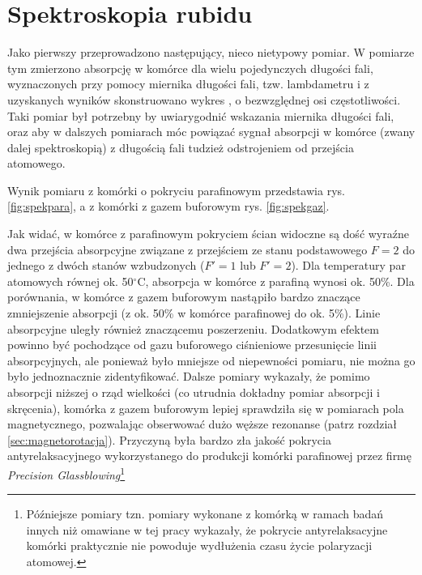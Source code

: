 \documentclass[a4paper,10pt,twoside]{report}
\begin{document}
\nopagebreak
\section{Spektroskopia rubidu}
Jako pierwszy przeprowadzono następujący, nieco nietypowy pomiar.
W pomiarze tym zmierzono absorpcję w komórce dla wielu pojedynczych długości fali, wyznaczonych przy pomocy miernika długości fali, tzw. lambdametru i z uzyskanych wyników skonstruowano wykres , o bezwzględnej osi częstotliwości.
Taki pomiar był potrzebny by uwiarygodnić wskazania miernika długości fali, oraz aby w dalszych pomiarach móc powiązać sygnał absorpcji w komórce (zwany dalej spektroskopią) z długością fali tudzież odstrojeniem od przejścia atomowego.
 
Wynik pomiaru z komórki o pokryciu parafinowym przedstawia rys. \ref{fig:spekpara}, a z komórki z gazem buforowym rys. \ref{fig:spekgaz}.


Jak widać, w komórce z parafinowym pokryciem ścian widoczne są dość wyraźne dwa przejścia absorpcyjne związane z przejściem ze stanu podstawowego $F=2$ do jednego z dwóch stanów wzbudzonych ($F'=1$ lub $F'=2$). Dla temperatury par atomowych równej ok. 50$^\circ$C, absorpcja w komórce z parafiną wynosi ok. 50\%. Dla porównania, w komórce z gazem buforowym nastąpiło bardzo znaczące zmniejszenie absorpcji (z ok. 50\% w komórce parafinowej do ok. 5\%). Linie absorpcyjne uległy również znaczącemu poszerzeniu. Dodatkowym efektem powinno być pochodzące od gazu buforowego ciśnieniowe przesunięcie linii absorpcyjnych, ale ponieważ było mniejsze od niepewności pomiaru, nie można go było jednoznacznie zidentyfikować. Dalsze pomiary wykazały, że pomimo absorpcji niższej o rząd wielkości (co utrudnia dokładny pomiar absorpcji i skręcenia), komórka z gazem buforowym lepiej sprawdziła się w pomiarach pola magnetycznego, pozwalając obserwować dużo węższe rezonanse (patrz rozdział \ref{sec:magnetorotacja}). Przyczyną była bardzo zła jakość pokrycia antyrelaksacyjnego wykorzystanego do produkcji komórki parafinowej przez firmę \textit{Precision Glassblowing}\footnote{Późniejsze pomiary tzn. pomiary wykonane z komórką w ramach badań innych niż omawiane w tej pracy wykazały, że pokrycie antyrelaksacyjne komórki praktycznie nie powoduje wydłużenia czasu życie polaryzacji atomowej.}
\end{document}
